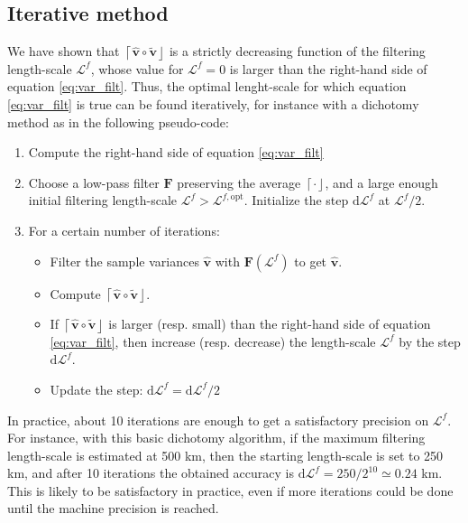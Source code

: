 \documentclass[12pt]{scrartcl}
\begin{document}
\subsection{Iterative method}
We have shown that $\left\lceil\widehat{\mathbf{v}} \circ \widetilde{\mathbf{v}}\right\rfloor$ is a strictly decreasing function of the filtering length-scale $\mathcal{L}^f$, whose value for $\mathcal{L}^f = 0$ is larger than the right-hand side of equation \eqref{eq:var_filt}. Thus, the optimal lenght-scale for which equation \eqref{eq:var_filt} is true can be found iteratively, for instance with a dichotomy method as in the following pseudo-code:
\begin{enumerate}
\item Compute the right-hand side of equation \eqref{eq:var_filt}
\item Choose a low-pass filter $\mathbf{F}$ preserving the average $\left\lceil \cdot \right\rfloor$, and a large enough initial filtering length-scale $\mathcal{L}^f > \mathcal{L}^{f,\mathrm{opt}}$. Initialize the step $\mathrm{d}\mathcal{L}^f$ at $\mathcal{L}^f/2$.
\item For a certain number of iterations:
\begin{itemize}
\item Filter the sample variances $\widehat{\mathbf{v}}$ with $\mathbf{F}\left(\mathcal{L}^f\right)$ to get $\widehat{\mathbf{v}}$.
\item Compute $\left\lceil\widehat{\mathbf{v}} \circ \widetilde{\mathbf{v}}\right\rfloor$.
\item If $\left\lceil\widehat{\mathbf{v}} \circ \widetilde{\mathbf{v}}\right\rfloor$ is larger (resp. small) than the right-hand side of equation \eqref{eq:var_filt}, then increase (resp. decrease) the length-scale $\mathcal{L}^f$ by the step $\mathrm{d}\mathcal{L}^f$.
\item Update the step: $\mathrm{d}\mathcal{L}^f = \mathrm{d}\mathcal{L}^f/2$ 
\end{itemize}
\end{enumerate}
In practice, about 10 iterations are enough to get a satisfactory precision on $\mathcal{L}^f$. For instance, with this basic dichotomy algorithm, if the maximum filtering length-scale is estimated at 500 km, then the starting length-scale is set to 250 km, and after 10 iterations the obtained accuracy is $\mathrm{d}\mathcal{L}^f = 250/2^{10} \simeq 0.24$ km. This is likely to be satisfactory in practice, even if more iterations could be done until the machine precision is reached.
\end{document}
